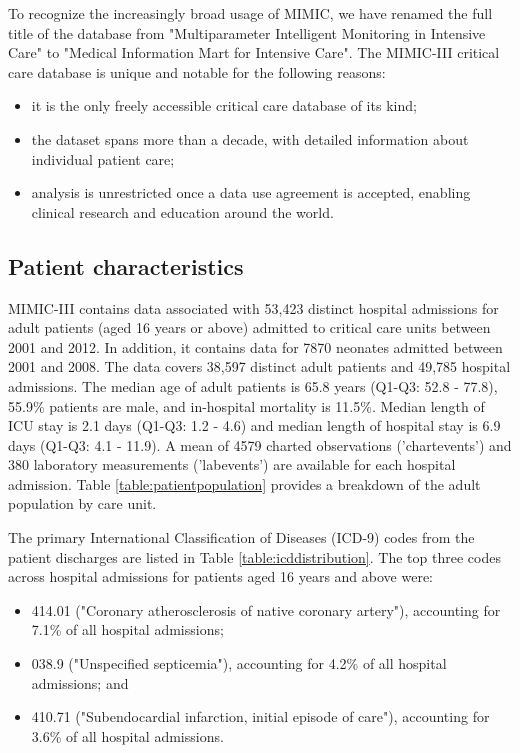 \documentclass[english]{article}
\begin{document}

To recognize the increasingly broad usage of MIMIC, we have renamed the full title of the database from "Multiparameter Intelligent Monitoring in Intensive Care" to "Medical Information Mart for Intensive Care". The MIMIC-III critical care database is unique and notable for the following reasons:
\begin{itemize}
  \item it is the only freely accessible critical care database of its kind;
  \item the dataset spans more than a decade, with detailed information about individual patient care;
  \item analysis is unrestricted once a data use agreement is accepted, enabling clinical research and education around the world.
\end{itemize}

\subsection*{Patient characteristics}

MIMIC-III contains data associated with 53,423 distinct hospital admissions for adult patients (aged 16 years or above) admitted to critical care units between 2001 and 2012. In addition, it contains data for 7870 neonates admitted between 2001 and 2008. The data covers 38,597 distinct adult patients and 49,785 hospital admissions. The median age of adult patients is 65.8 years (Q1-Q3: 52.8 - 77.8), 55.9\% patients are male, and in-hospital mortality is 11.5\%. Median length of ICU stay is 2.1 days (Q1-Q3: 1.2 - 4.6) and median length of hospital stay is 6.9 days (Q1-Q3: 4.1 - 11.9). A mean of 4579 charted observations ('chartevents') and 380 laboratory measurements ('labevents') are available for each hospital admission. Table \ref{table:patientpopulation} provides a breakdown of the adult population by care unit.

The primary International Classification of Diseases (ICD-9) codes from the patient discharges are listed in Table \ref{table:icddistribution}. The top three codes across hospital admissions for patients aged 16 years and above were:
\begin{itemize}
\item 414.01 ("Coronary atherosclerosis of native coronary artery"), accounting for 7.1\% of all hospital admissions;
\item 038.9 ("Unspecified septicemia"), accounting for 4.2\% of all hospital admissions; and
\item 410.71 ("Subendocardial infarction, initial episode of care"), accounting for 3.6\% of all hospital admissions.
\end{itemize}
\end{document}
